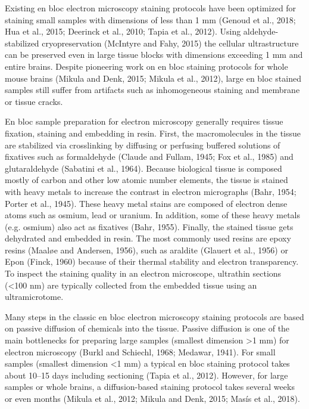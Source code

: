 \documentclass{article}
\begin{document}
Existing en bloc electron microscopy staining protocols have been optimized for staining small samples with dimensions of less than 1 mm (Genoud et al., 2018; Hua et al., 2015; Deerinck et al., 2010; Tapia et al., 2012). Using aldehyde-stabilized cryopreservation (McIntyre and Fahy, 2015) the cellular ultrastructure can be preserved even in large tissue blocks with dimensions exceeding 1 mm and entire brains. Despite pioneering work on en bloc staining protocols for whole mouse brains (Mikula and Denk, 2015; Mikula et al., 2012), large en bloc stained samples still suffer from artifacts such as inhomogeneous staining and membrane or tissue cracks.

En bloc sample preparation for electron microscopy generally requires tissue fixation, staining and embedding in resin. First, the macromolecules in the tissue are stabilized via crosslinking by diffusing or perfusing buffered solutions of fixatives such as formaldehyde (Claude and Fullam, 1945; Fox et al., 1985) and glutaraldehyde (Sabatini et al., 1964). Because biological tissue is composed mostly of carbon and other low atomic number elements, the tissue is stained with heavy metals to increase the contrast in electron micrographs (Bahr, 1954; Porter et al., 1945). These heavy metal stains are composed of electron dense atoms such as osmium, lead or uranium. In addition, some of these heavy metals (e.g. osmium) also act as fixatives (Bahr, 1955). Finally, the stained tissue gets dehydrated and embedded in resin. The most commonly used resins are epoxy resins (Maaløe and Andersen, 1956), such as araldite (Glauert et al., 1956) or Epon (Finck, 1960) because of their thermal stability and electron transparency. To inspect the staining quality in an electron microscope, ultrathin sections (<100 nm) are typically collected from the embedded tissue using an ultramicrotome.

Many steps in the classic en bloc electron microscopy staining protocols are based on passive diffusion of chemicals into the tissue. Passive diffusion is one of the main bottlenecks for preparing large samples (smallest dimension >1 mm) for electron microscopy (Burkl and Schiechl, 1968; Medawar, 1941). For small samples (smallest dimension <1 mm) a typical en bloc staining protocol takes about 10–15 days including sectioning (Tapia et al., 2012). However, for large samples or whole brains, a diffusion-based staining protocol takes several weeks or even months (Mikula et al., 2012; Mikula and Denk, 2015; Masís et al., 2018).
\end{document}
